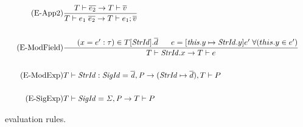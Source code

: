 \begin{figure}[htb]
\begin{align*}
\\
\\
\tag{E-App2}
&\frac{T \vdash \overline{e_{2}} \rightarrow T \vdash \overline{v}}
{T \vdash e_{1}\;\overline{e_{2}} \rightarrow T \vdash e_{1};\overline{v}}
\\
\\
\tag{E-ModField}
&\frac{\;\;\;\;\;\; (x=e':\tau) \in T[\mathit{StrId}].\overline{d} \;\;\;\;\;\; e=[\mathit{this}.y\mapsto \mathit{StrId}.y]e'\;\forall (this.y \in e')}
{T \vdash \mathit{StrId}.x \rightarrow T \vdash e}\\
\\
\tag{E-ModExp}
&T \vdash \mathit{StrId:SigId = \overline{d},P} \rightarrow (\mathit{StrId} \mapsto \overline{d}), T \vdash P \\
\\
\tag{E-SigExp}
&T \vdash \mathit{SigId = \Sigma, P} \rightarrow T \vdash P
\end{align*}
\caption[\MiniML\ Evaluation Rules]{\MiniML\ evaluation rules.\label{fig:MiniMLOperationalSemantics}}
\end{figure}
